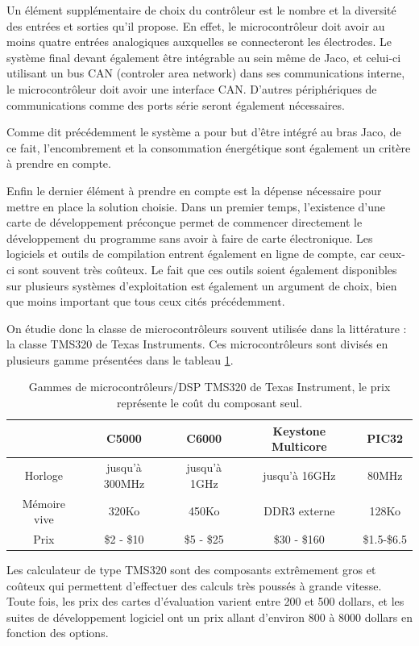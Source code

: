 \documentclass[letterpaper, twoside, 12pt, memoire, creativecommons, hyperref]{thETS}
\begin{document}
Un élément supplémentaire de choix du contrôleur est le nombre et la diversité des entrées et sorties qu'il propose. En effet, le microcontrôleur doit avoir au moins quatre entrées analogiques auxquelles se connecteront les électrodes. Le système final devant également être intégrable au sein même de Jaco, et celui-ci utilisant un bus CAN (controler area network) dans ses communications interne, le microcontrôleur doit avoir une interface CAN. D'autres périphériques de communications comme des ports série seront également nécessaires. 

Comme dit précédemment le système a pour but d'être intégré au bras Jaco, de ce fait, l'encombrement et la consommation énergétique sont également un critère à prendre en compte.

Enfin le dernier élément à prendre en compte est la dépense nécessaire pour mettre en place la solution choisie. Dans un premier temps, l'existence d'une carte de développement préconçue permet de commencer directement le développement du programme sans avoir à faire de carte électronique. Les logiciels et outils de compilation entrent également en ligne de compte, car ceux-ci sont souvent très coûteux. Le fait que ces outils soient également disponibles sur plusieurs systèmes d'exploitation est également un argument de choix, bien que moins important que tous ceux cités précédemment. 

On étudie donc la classe de microcontrôleurs souvent utilisée dans la littérature : la classe TMS320 de Texas Instruments.
Ces microcontrôleurs sont divisés en plusieurs gamme présentées dans le tableau \ref{tab:tms320}.

\begin{table}[ht]
	\caption{Gammes de microcontrôleurs/DSP TMS320 de Texas Instrument, le prix représente le coût du composant seul. }
		\begin{tabular}{|c|c|c|c|c|}
		\hline
			& C5000 & C6000 & Keystone Multicore & PIC32\\
	    \hline
	    	Horloge & jusqu'à 300MHz & jusqu'à 1GHz & jusqu'à 16GHz & 80MHz\\
	    \hline
			Mémoire vive & 320Ko & 450Ko & DDR3 externe & 128Ko\\
	    \hline
	    	Prix & \$2 - \$10 & \$5 - \$25 & \$30 - \$160 & \$1.5-\$6.5\\
	    \hline
		\end{tabular}
	\label{tab:tms320}
\end{table}

Les calculateur de type TMS320 sont des composants extrêmement gros et coûteux qui permettent d'effectuer des calculs très poussés à grande vitesse.  Toute fois, les prix des cartes d'évaluation varient entre 200 et 500 dollars, et les suites de développement logiciel ont un prix allant d'environ 800 à 8000 dollars en fonction des options. 
\end{document}
